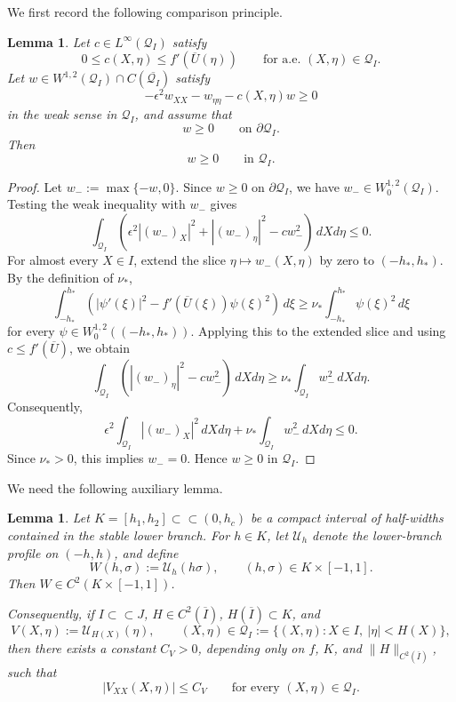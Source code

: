 \documentclass[reqno,12pt]{amsart}
\numberwithin{equation}{section}
\newtheorem{lemma}[theorem]{Lemma}
\theoremstyle{remark}
\begin{document}
We first record the following comparison principle.  

\begin{lemma} \label{lem:slow-channel-maximum}
Let $c\in L^\infty(\mathcal Q_I)$ satisfy
$$
0\le c(X,\eta)\le f'(\overline U(\eta))
\qquad\text{for a.e. }(X,\eta)\in\mathcal Q_I.
$$
Let $w\in W^{1,2}(\mathcal Q_I)\cap C(\overline{\mathcal Q_I})$ satisfy
$$
-\epsilon^2 w_{XX}-w_{\eta\eta}-c(X,\eta)w\ge0
$$
in the weak sense in $\mathcal Q_I$, and assume that
$$
w\ge0\qquad\text{on }\partial\mathcal Q_I.
$$
Then
$$
w\ge0\qquad\text{in }\mathcal Q_I.
$$
\end{lemma}

\begin{proof}
Let $w_-:=\max\{-w,0\}.$
Since $w\ge0$ on $\partial\mathcal Q_I$, we have
$w_-\in W_0^{1,2}(\mathcal Q_I)$.  Testing the weak inequality with $w_-$
gives
$$
\int_{\mathcal Q_I}
\left(\epsilon^2 |(w_-)_X|^2+|(w_-)_\eta|^2-cw_-^2\right)\,dX d\eta
\le0.
$$
For almost every $X\in I$, extend the slice $\eta\mapsto w_-(X,\eta)$ by zero to
$(-h_*,h_*)$.  By the definition of $\nu_*$,
$$
\int_{-h_*}^{h_*}
\left(|\psi'(\xi)|^2-f'(\overline U(\xi))\psi(\xi)^2\right)\,d\xi
\ge
\nu_*\int_{-h_*}^{h_*}\psi(\xi)^2\,d\xi
$$
for every $\psi\in W_0^{1,2}((-h_*,h_*))$.  Applying this to the extended slice
and using $c\le f'(\overline U)$, we obtain
$$
\int_{\mathcal Q_I}
\left(|(w_-)_\eta|^2-cw_-^2\right)\,dX d\eta
\ge
\nu_*\int_{\mathcal Q_I}w_-^2\,dX d\eta.
$$
Consequently,
$$
\epsilon^2\int_{\mathcal Q_I}|(w_-)_X|^2\,dX d\eta
+ \nu_*\int_{\mathcal Q_I}w_-^2\,dX d\eta
\le0.
$$
Since $\nu_*>0$, this implies $w_-=0$.  Hence $w\ge0$ in
$\mathcal Q_I$.
\end{proof}

We  need the following auxiliary lemma. 

\begin{lemma}
\label{lem:slow-profile-xbounds}
Let $K=[h_1,h_2]\subset\subset(0,h_c)$ be a compact interval of half-widths contained in the stable lower branch. For $h\in K$, let $\mathcal U_h$ denote the lower-branch profile on $(-h,h)$, and define
$$
W(h,\sigma):=\mathcal U_h(h\sigma),
\qquad
(h,\sigma)\in K\times[-1,1].
$$
Then $W\in C^2(K\times[-1,1])$. 

Consequently, if $I\subset\subset J$, 
$H\in C^2(\overline I)$,   $H(\overline I)\subset K$, and 
$$
V(X,\eta):=\mathcal U_{H(X)}(\eta),
\qquad
(X,\eta)\in\mathcal Q_I:=\{(X,\eta):X\in I,\ |\eta|<H(X)\},
$$
then there exists a constant $C_V>0$, depending only on $f$, $K$, and
$\|H\|_{C^2(\overline I)}$, such that
$$
|V_{XX}(X,\eta)|\le C_V
\qquad\text{for every }(X,\eta)\in\mathcal Q_I.
$$
\end{lemma}
\end{document}
